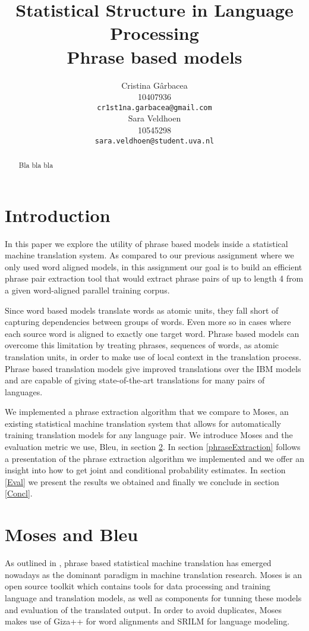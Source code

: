 \documentclass[11pt]{article}
\title{Statistical Structure in Language Processing \\ Phrase based models}
\author{ Cristina G\^arbacea\\
  10407936 \\
  {\small \tt cr1st1na.garbacea@gmail.com} 
  \\\And
  Sara Veldhoen \\
10545298   \\
  {\small \tt sara.veldhoen@student.uva.nl} \\}
\date{}
\begin{document}
\maketitle

\begin{abstract}
Bla bla bla
\end{abstract}

\section{Introduction}
In this paper we explore the utility of phrase based models inside a statistical machine translation system. As compared to our previous assignment where we only used word aligned models, in this assignment our goal is to build an efficient phrase pair extraction tool that would extract phrase pairs of up to length 4 from a given word-aligned parallel training corpus. 

Since word based models translate words as atomic units, they fall short of capturing dependencies between groups of words. 
Even more so in cases where each source word is aligned to exactly one target word.
 Phrase based models can overcome this limitation by treating phrases, sequences of words, as atomic translation units, in order to make use of local context in the translation process. Phrase based translation models give improved translations over the IBM models and are capable of giving state-of-the-art translations for many pairs of languages.


We implemented a phrase extraction algorithm that we compare to Moses, an existing statistical machine translation system that allows for automatically training translation models for any language pair. We introduce Moses and the evaluation metric we use, Bleu, in section \ref{existing}. In section \ref{phraseExtraction} follows a presentation of the phrase extraction algorithm we implemented and we offer an insight into how to get joint and conditional probability estimates.
In section \ref{Eval} we present the results we obtained and finally we conclude in section \ref{Concl}.

\section{Moses and Bleu}
\label{existing}
As outlined in \cite{moses}, phrase based statistical machine translation has emerged nowadays as the dominant paradigm in machine translation research. Moses \cite{mosesurl} is an open source toolkit which contains tools for data processing and training language and translation models, as well as components for tunning these models and evaluation of the translated output. In order to avoid duplicates, Moses makes use of Giza++ \cite{giza++} for word alignments and SRILM \cite{srilm} for language modeling. 
\end{document}

